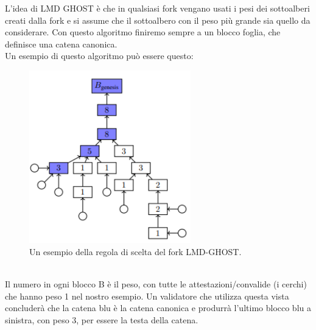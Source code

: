 \documentclass[a4paper,11pt]{report}
\begin{document}
\newpage
L'idea di LMD GHOST è che in qualsiasi fork vengano usati i pesi dei sottoalberi creati dalla fork e si assume che il sottoalbero con il peso più grande sia quello da considerare. 
Con questo algoritmo finiremo sempre a un blocco foglia, che definisce una catena canonica.\\
Un esempio di questo algoritmo può essere questo:\\
\begin{figure}[htbp] 
\begin{center}
\includegraphics[width=7cm]{img/esGHOST.png}
\end{center}
\caption{Un esempio della regola di scelta del fork LMD-GHOST.}
\end{figure}
\\Il numero in ogni blocco B è il peso, con tutte le attestazioni/convalide (i cerchi) che hanno peso 1 nel nostro esempio. Un validatore che utilizza questa vista concluderà che la catena blu è la catena canonica e produrrà l'ultimo blocco blu a sinistra, con peso 3, per essere la testa della catena.
\newpage
\end{document}
